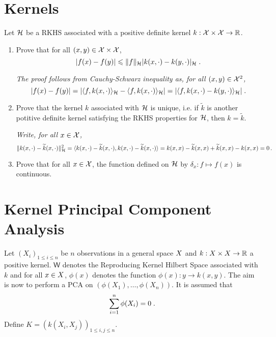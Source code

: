 \section{Kernels}
 Let $\mathcal{H}$ be a RKHS associated with a positive definite kernel $k: \mathcal{X}\times \mathcal{X} \to \mathbb{R}$.
\begin{enumerate}
\item  Prove that for all $(x,y)\in\mathcal{X}\times \mathcal{X}$, 
\[
|f(x)-f(y)|\leqslant \|f\|_{\mathcal{H}}|k(x,\cdot)-k(y,\cdot)|_{\mathcal{H}}\;.
\]

\vspace{.2cm}

{\em
The proof follows from Cauchy-Schwarz inequality as, for all $(x,y)\in\mathcal{X}^2$,
$$
|f(x)-f(y)|= |\langle f, k(x,\cdot)\rangle_{\mathcal{H}}-\langle f, k(x,\cdot)\rangle_{\mathcal{H}}| = |\langle f, k(x,\cdot)-k(y,\cdot)\rangle_{\mathcal{H}}|\;.
$$
}

\item  Prove that the kernel $k$ associated with $\mathcal{H}$ is unique, i.e. if $\widetilde k$ is another potitive definite kernel satisfying the RKHS properties for $\mathcal{H}$, then $k = \widetilde k$.

\vspace{.2cm}

{\em
Write, for all $x\in\mathcal{X}$,
$$
\|k(x,\cdot) - \widetilde k(x,\cdot)\|_{\mathcal{H}}^2 = \langle k(x,\cdot) - \widetilde k(x,\cdot),k(x,\cdot) - \widetilde k(x,\cdot)\rangle = k(x,x) - \widetilde k(x,x) +  \widetilde k(x,x) - k(x,x)= 0\,.
$$
}

\item  Prove that  for all $x\in\mathcal{X}$, the function defined on $\mathcal{H}$ by $\delta_x: f \mapsto f(x)$ is continuous.

\vspace{.2cm}

{\em

}
\end{enumerate}

\section{Kernel Principal Component Analysis}
\label{ex:kernel:pca}
Let $(X_i)_{1\leqslant i \leqslant n}$ be $n$ observations in a general space $X$ and $k: X\times X \to \mathbb{R}$ a positive kernel. $\mathsf{W}$ denotes the Reproducing Kernel Hilbert Space associated with $k$ and for all $x\in X$, $\phi(x)$ denotes the function $\phi(x): y\to k(x,y)$. The aim is now to perform a PCA on $(\phi(X_1),\ldots,\phi(X_n))$. It is assumed that
$$
\sum_{i=1}^n \phi(X_i) = 0\;.
$$
Define $ K = \left(k(X_i,X_j)\right)_{1\leqslant i,j \leqslant n}$.

